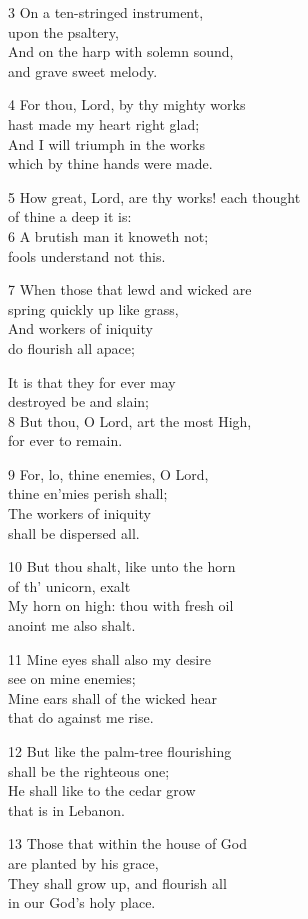 3 On a ten-stringed instrument,\\
upon the psaltery,\\
And on the harp with solemn sound,\\
and grave sweet melody.

4 For thou, Lord, by thy mighty works\\
hast made my heart right glad;\\
And I will triumph in the works\\
which by thine hands were made.

5 How great, Lord, are thy works! each thought\\
of thine a deep it is:\\
6 A brutish man it knoweth not;\\
fools understand not this.

7 When those that lewd and wicked are\\
spring quickly up like grass,\\
And workers of iniquity\\
do flourish all apace;

It is that they for ever may\\
destroyed be and slain;\\
8 But thou, O Lord, art the most High,\\
for ever to remain.

9 For, lo, thine enemies, O Lord,\\
thine en’mies perish shall;\\
The workers of iniquity\\
shall be dispersed all.

10 But thou shalt, like unto the horn\\
of th’ unicorn, exalt\\
My horn on high: thou with fresh oil\\
anoint me also shalt.

11 Mine eyes shall also my desire\\
see on mine enemies;\\
Mine ears shall of the wicked hear\\
that do against me rise.

12 But like the palm-tree flourishing\\
shall be the righteous one;\\
He shall like to the cedar grow\\
that is in Lebanon.

13 Those that within the house of God\\
are planted by his grace,\\
They shall grow up, and flourish all\\
in our God’s holy place.

